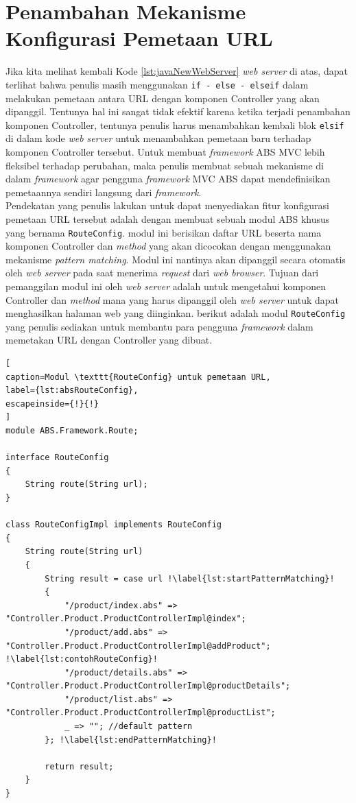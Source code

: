 \section{Penambahan Mekanisme Konfigurasi Pemetaan URL}

Jika kita melihat kembali Kode \ref{lst:javaNewWebServer} \textit{web server} di atas, dapat terlihat bahwa penulis masih menggunakan \texttt{if - else - elseif} dalam melakukan pemetaan antara URL dengan komponen Controller yang akan dipanggil. Tentunya hal ini sangat tidak efektif karena ketika terjadi penambahan komponen Controller, tentunya penulis harus menambahkan kembali blok \texttt{elsif} di dalam kode \textit{web server} untuk menambahkan pemetaan baru terhadap komponen Controller tersebut. Untuk membuat \textit{framework} ABS MVC lebih fleksibel terhadap perubahan, maka penulis membuat sebuah mekanisme di dalam \textit{framework} agar pengguna \textit{framework} MVC ABS dapat mendefinisikan pemetaannya sendiri langsung dari \textit{framework}.\\

Pendekatan yang penulis lakukan untuk dapat menyediakan fitur konfigurasi pemetaan URL tersebut adalah dengan membuat sebuah modul ABS khusus yang bernama \texttt{RouteConfig}. modul ini berisikan daftar URL beserta nama komponen Controller dan \textit{method} yang akan dicocokan dengan menggunakan mekanisme \textit{pattern matching}. Modul ini nantinya akan dipanggil secara otomatis oleh \textit{web server} pada saat menerima \textit{request} dari \textit{web browser}. Tujuan dari pemanggilan modul ini oleh \textit{web server} adalah untuk mengetahui komponen Controller dan \textit{method} mana yang harus dipanggil oleh \textit{web server} untuk dapat menghasilkan halaman web yang diinginkan. berikut adalah modul \texttt{RouteConfig} yang penulis sediakan untuk membantu para pengguna \textit{framework} dalam memetakan URL dengan Controller yang dibuat.

\begin{lstlisting}[
caption=Modul \texttt{RouteConfig} untuk pemetaan URL,
label={lst:absRouteConfig},
escapeinside={!}{!}
]
module ABS.Framework.Route;

interface RouteConfig
{
	String route(String url);
}

class RouteConfigImpl implements RouteConfig
{
	String route(String url)
	{
		String result = case url !\label{lst:startPatternMatching}!
		{
			"/product/index.abs" => "Controller.Product.ProductControllerImpl@index";
			"/product/add.abs" => "Controller.Product.ProductControllerImpl@addProduct"; !\label{lst:contohRouteConfig}!
			"/product/details.abs" => "Controller.Product.ProductControllerImpl@productDetails";
			"/product/list.abs" => "Controller.Product.ProductControllerImpl@productList";
			_ => ""; //default pattern
		}; !\label{lst:endPatternMatching}!
		
		return result;
	}
}
\end{lstlisting}

